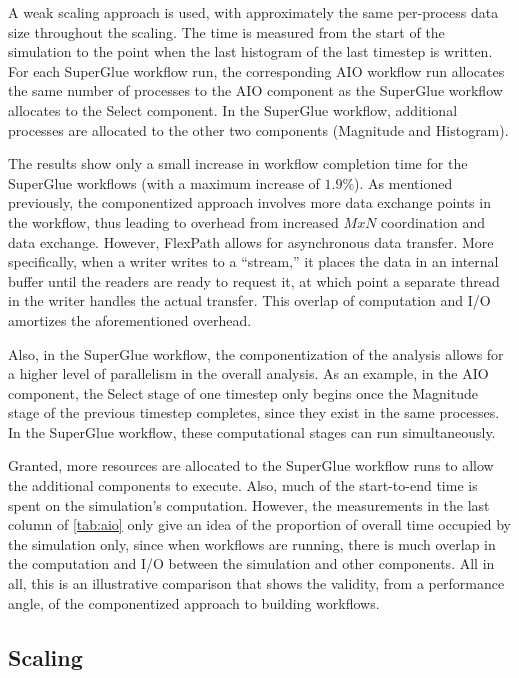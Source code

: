 A weak scaling approach
is used, with approximately the same
per-process data size throughout the scaling.
The time is measured from the start of the simulation
to the point when the last histogram of
the last timestep is written.
For each SuperGlue workflow run, the corresponding
AIO workflow run allocates the same
number of processes to the AIO component
as the SuperGlue workflow allocates to the Select component.
In the SuperGlue workflow, additional processes
are allocated to the other two components
(Magnitude and Histogram).

The results show only a small increase in
workflow completion time for the SuperGlue
workflows (with a maximum increase of $1.9 \%$).
As mentioned previously, the componentized
approach involves more data exchange points
in the workflow, thus leading to
overhead from increased $MxN$ coordination and data exchange.
However, FlexPath allows
for asynchronous data transfer.
More specifically, when a writer writes to
a ``stream,'' it places
the data in an internal buffer
until the readers are ready to request it,
at which point a separate thread in the writer
handles the actual transfer.
This overlap
of computation and I/O
amortizes the aforementioned overhead.

Also, in the SuperGlue workflow,
the componentization of the analysis
allows for a higher level of parallelism in the overall
analysis. As an example, in the AIO component,
the Select stage of one timestep
only begins once the Magnitude
stage of the previous timestep
completes, since they exist in the same processes.
In the SuperGlue workflow, these
computational stages can run simultaneously.

Granted, more resources are allocated to the
SuperGlue workflow runs to allow the additional
components to execute.
Also, much of the start-to-end time is spent on
the simulation's computation.
However, the measurements in the last column
of \autoref{tab:aio}
only give an idea of the proportion of 
overall time occupied by the simulation only,
since when workflows are running, there is much
overlap in the computation and I/O between the
simulation and other components.
All in all, this is
an illustrative comparison that shows the validity,
from a performance angle,
of the componentized approach
to building workflows.

\subsection{Scaling}

